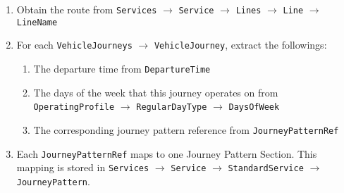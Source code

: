 \begin{enumerate}
  \item Obtain the route from \texttt{Services} $\rightarrow$ \texttt{Service} $\rightarrow$ \texttt{Lines} $\rightarrow$ \texttt{Line} $\rightarrow$ \texttt{LineName}
  \item For each \texttt{VehicleJourneys} $\rightarrow$ \texttt{VehicleJourney}, extract the followings:
  \begin{enumerate}
    \item The departure time from \texttt{DepartureTime}
    \item The days of the week that this journey operates on from \texttt{OperatingProfile} $\rightarrow$ \texttt{RegularDayType} $\rightarrow$ \texttt{DaysOfWeek}
    \item The corresponding journey pattern reference from \texttt{JourneyPatternRef}
  \end{enumerate}
  \item Each \texttt{JourneyPatternRef} maps to one Journey Pattern Section. This mapping is stored in \texttt{Services} $\rightarrow$ \texttt{Service} $\rightarrow$ \texttt{StandardService} $\rightarrow$ \texttt{JourneyPattern}.


\end{enumerate}
